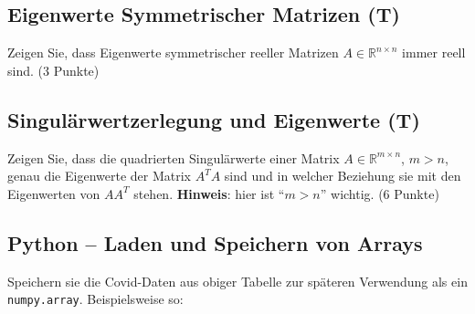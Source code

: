 \documentclass[]{book}
\theoremstyle{definition}
\theoremstyle{definition}
\theoremstyle{definition}
\theoremstyle{definition}
\theoremstyle{remark}
\begin{document}
\hypertarget{eigenwerte-symmetrischer-matrizen-t}{%
\subsection{Eigenwerte Symmetrischer Matrizen (T)}\label{eigenwerte-symmetrischer-matrizen-t}}

Zeigen Sie, dass Eigenwerte symmetrischer reeller Matrizen \(A\in \mathbb R^{n\times n}\) immer reell sind. (3 Punkte)

\hypertarget{singuluxe4rwertzerlegung-und-eigenwerte-t}{%
\subsection{Singulärwertzerlegung und Eigenwerte (T)}\label{singuluxe4rwertzerlegung-und-eigenwerte-t}}

Zeigen Sie, dass die quadrierten Singulärwerte einer Matrix \(A\in \mathbb R^{m\times n}\), \(m>n\), genau die Eigenwerte der Matrix \(A^TA\) sind und in welcher Beziehung sie mit den Eigenwerten von \(AA^T\) stehen. \textbf{Hinweis}: hier ist ``\(m>n\)'' wichtig. (6 Punkte)

\hypertarget{python-laden-und-speichern-von-arrays}{%
\subsection{Python -- Laden und Speichern von Arrays}\label{python-laden-und-speichern-von-arrays}}

Speichern sie die Covid-Daten aus obiger Tabelle zur späteren Verwendung als ein \texttt{numpy.array}. Beispielsweise so:
\end{document}
